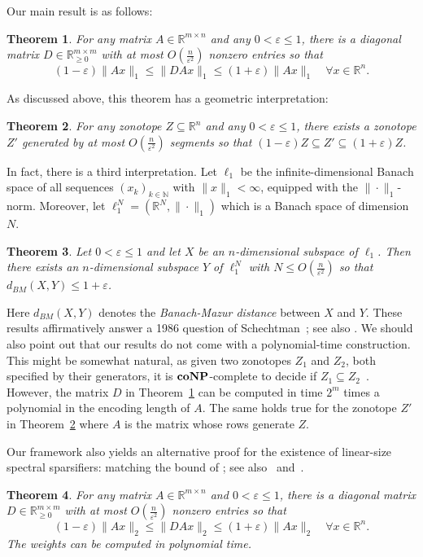 \documentclass[12pt,english]{article}
\theoremstyle{theorem}
\newtheorem{theorem}{Theorem}
\theoremstyle{remark}
\providecommand{\setN}{\mathbb{N}}
\providecommand{\setR}{\mathbb{R}}
\begin{document}
Our main result is as follows:
\begin{theorem} \label{thm:L1Sparsifier}
For any matrix $A \in \setR^{m \times n}$ and any $0<\varepsilon \leq 1$, there is a diagonal matrix $D \in \setR_{\geq 0}^{m \times m}$ with at most $O(\frac{n}{\varepsilon^2})$
 nonzero entries so that
  \[
  (1-\varepsilon) \|Ax\|_1 \leq \|DAx\|_1 \leq (1+\varepsilon)\|Ax\|_1 \quad \forall x \in \setR^n.
  \]
\end{theorem}
As discussed above, this theorem has a geometric interpretation:
\begin{theorem} \label{thm:L1SparsifierV2}
For any zonotope $Z \subseteq \setR^{n}$ and any $0<\varepsilon \leq 1$, there exists a zonotope $Z'$ generated by at most $O(\frac{n}{\varepsilon^2})$ segments so that
  ${(1-\varepsilon) Z \subseteq Z' \subseteq (1+\varepsilon) Z}$. 
\end{theorem}
In fact, there is a third interpretation. Let $\ell_1$ be the infinite-dimensional
Banach space of all sequences $(x_k)_{k \in \setN}$
with $\|x\|_1 < \infty$, equipped with the $\| \cdot \|_1$-norm.
Moreover, let $\ell_1^N = (\setR^N,\| \cdot \|_1)$ which is a Banach space of dimension $N$.
\begin{theorem} \label{thm:L1SparsifierV3}
  Let $0<\varepsilon \leq 1$ and let $X$ be an $n$-dimensional subspace of $\ell_1$. Then there exists an $n$-dimensional
  subspace $Y$ of $\ell_1^N$ with $N \leq O(\frac{n}{\varepsilon^2})$ so that $d_{BM}(X,Y) \leq 1+\varepsilon$.
\end{theorem}
Here $d_{BM}(X,Y)$ denotes the \emph{Banach-Mazur distance} between $X$ and $Y$.
These results affirmatively answer a 1986 question of Schechtman~\cite[Problem 7]{Schechtman1987}; see also \cite{AIM2007FourierConvex}. We should also point out that our results do not come with a polynomial-time construction. This might be somewhat natural, as given two zonotopes $Z_1$ and $Z_2$, both specified by their generators, it is ${\bf coNP}$-complete to decide if $Z_1 \subseteq Z_2$~\cite{KulmburgAlthoff2021}. However, the matrix $D$ in Theorem~\ref{thm:L1Sparsifier} can be computed in time $2^m$ times a polynomial in the encoding length of $A$. The same holds true for the zonotope $Z'$ in Theorem~\ref{thm:L1SparsifierV2} where $A$ is the matrix whose rows generate $Z$.

Our framework also yields an alternative proof for the existence of linear-size spectral sparsifiers:
matching the bound of \cite{BatsonSpielmanSrivastavaSTOC2009,BatsonSpielmanSrivastava2012}; see also~\cite{ReisRothvoss2020} and~\cite{PaschalidisZhuang2024}.
\begin{theorem} \label{thm:L2Sparsifier}
For any matrix $A \in \setR^{m \times n}$ and $0<\varepsilon \leq 1$, there is a diagonal matrix $D \in \setR_{\geq 0}^{m \times m}$ with at most $O(\frac{n}{\varepsilon^2})$ nonzero entries so that
  \[
  (1-\varepsilon) \|Ax\|_2 \leq \|DAx\|_2 \leq (1+\varepsilon)\|Ax\|_2 \quad \forall x \in \setR^n.
  \]
  The weights can be computed in polynomial time.
\end{theorem}
\end{document}
